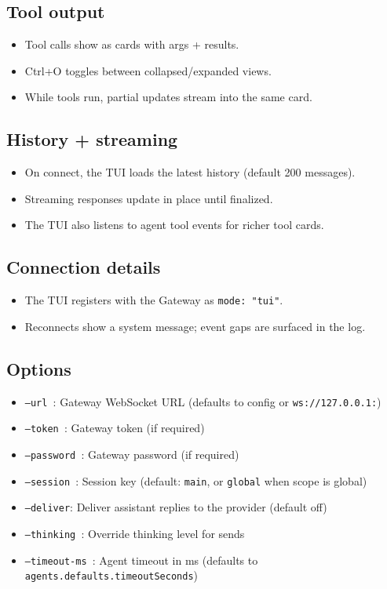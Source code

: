 \subsection{Tool output}


\begin{itemize}
  \item Tool calls show as cards with args + results.
  \item Ctrl+O toggles between collapsed/expanded views.
  \item While tools run, partial updates stream into the same card.
\end{itemize}


\subsection{History + streaming}


\begin{itemize}
  \item On connect, the TUI loads the latest history (default 200 messages).
  \item Streaming responses update in place until finalized.
  \item The TUI also listens to agent tool events for richer tool cards.
\end{itemize}


\subsection{Connection details}


\begin{itemize}
  \item The TUI registers with the Gateway as \texttt{mode: "tui"}.
  \item Reconnects show a system message; event gaps are surfaced in the log.
\end{itemize}


\subsection{Options}


\begin{itemize}
  \item \texttt{--url }: Gateway WebSocket URL (defaults to config or \texttt{ws://127.0.0.1:})
  \item \texttt{--token }: Gateway token (if required)
  \item \texttt{--password }: Gateway password (if required)
  \item \texttt{--session }: Session key (default: \texttt{main}, or \texttt{global} when scope is global)
  \item \texttt{--deliver}: Deliver assistant replies to the provider (default off)
  \item \texttt{--thinking }: Override thinking level for sends
  \item \texttt{--timeout-ms }: Agent timeout in ms (defaults to \texttt{agents.defaults.timeoutSeconds})
\end{itemize}


